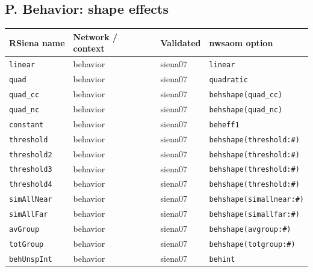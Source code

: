 \subsection*{P. Behavior: shape effects}
\footnotesize
\begin{longtable}{@{}p{2.6cm}p{3.2cm}p{2.9cm}p{5.4cm}@{}}
\toprule
RSiena name & Network / context & Validated & nwsaom option\\
\midrule
\endhead
\texttt{linear} & behavior & siena07 & \texttt{linear}\\
\texttt{quad} & behavior & siena07 & \texttt{quadratic}\\
\texttt{quad\_cc} & behavior & siena07 & \texttt{behshape(quad\_cc)}\\
\texttt{quad\_nc} & behavior & siena07 & \texttt{behshape(quad\_nc)}\\
\texttt{constant} & behavior & siena07 & \texttt{beheff1}\\
\texttt{threshold} & behavior & siena07 & \texttt{behshape(threshold:\#)}\\
\texttt{threshold2} & behavior & siena07 & \texttt{behshape(threshold:\#)}\\
\texttt{threshold3} & behavior & siena07 & \texttt{behshape(threshold:\#)}\\
\texttt{threshold4} & behavior & siena07 & \texttt{behshape(threshold:\#)}\\
\texttt{simAllNear} & behavior & siena07 & \texttt{behshape(simallnear:\#)}\\
\texttt{simAllFar} & behavior & siena07 & \texttt{behshape(simallfar:\#)}\\
\texttt{avGroup} & behavior & siena07 & \texttt{behshape(avgroup:\#)}\\
\texttt{totGroup} & behavior & siena07 & \texttt{behshape(totgroup:\#)}\\
\texttt{behUnspInt} & behavior & siena07 & \texttt{behint}\\
\bottomrule
\end{longtable}
\normalsize

